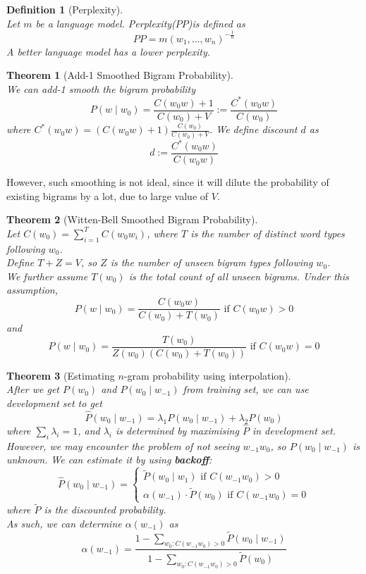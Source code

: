\documentclass[12pt]{article}
\newtheorem{definition}{Definition}[section]
\newtheorem{theorem}{Theorem}[section]
\theoremstyle{definition}
\begin{document}
\begin{definition}[Perplexity]
\hfill\\\normalfont Let $m$ be a language model. Perplexity($PP$)is defined as
\[
PP=m(w_1,\ldots, w_n)^{-\frac{1}{n}}
\]
A better language model has a lower perplexity.
\end{definition}
\begin{theorem}[Add-1 Smoothed Bigram Probability]
\hfill\\\normalfont We can add-1 smooth the bigram probability
\[
P(w\mid w_0) = \frac{C(w_0w)+1}{C(w_0) + V}:=\frac{C^\ast(w_0w)}{C(w_0)}
\]
where $C^\ast(w_0w)=(C(w_0w)+1)\frac{C(w_0)}{C(w_0)+V}$.
We define discount $d$ as
\[
d:=\frac{C^\ast(w_0w)}{C(w_0w)}
\]
\end{theorem}
However, such smoothing is not ideal, since it will dilute the probability of existing bigrams by a lot, due to large value of $V$.
\begin{theorem}[Witten-Bell Smoothed Bigram Probability]
\hfill\\\normalfont Let $C(w_0)=\sum_{i=1}^T C(w_0w_i)$, where $T$ is the number of distinct word types \textit{following} $w_0$.\\
Define  $T+Z=V$, so $Z$ is the number of unseen bigram types following $w_0$.\\
We further assume $T(w_0)$ is the total \textit{count} of all unseen bigrams. Under this assumption,
\[
P(w\mid w_0)=\frac{C(w_0w)}{C(w_0)+ T(w_0)}\text{ if }C(w_0w)>0
\]
and
\[
P(w\mid w_0)=\frac{T(w_0)}{Z(w_0)(C(w_0)+T(w_0))}\text{ if }C(w_0w)=0
\]
\end{theorem}
\begin{theorem}[Estimating {$n$}-gram probability using interpolation]
\hfill\\\normalfont After we get $P(w_0)$ and $P(w_0\mid w_{-1})$ from training set, we can use development set to get
\[
\hat{P}(w_0\mid w_{-1})=\lambda_1 P(w_0\mid w_{-1}) + \lambda_2 P(w_0)
\]
where $\sum_{i}\lambda_i = 1$, and $\lambda_i$ is determined by maximising $\hat{P}$ in development set.\\
However, we may encounter the problem of not seeing $w_{-1}w_0$, so $P(w_0\mid w_{-1})$ is unknown. We can estimate it by using \textbf{backoff}:
\[
\hat{P}(w_0\mid w_{-1})=\begin{cases}
\tilde{P}(w_0\mid w_1)\text{ if }C(w_{-1}w_0)>0\\
\alpha(w_{-1})\cdot \tilde{P}(w_0)\text{ if }C(w_{-1}w_0)=0
\end{cases}
\]
where $\tilde{P}$ is the discounted probability.\\
As such, we can determine $\alpha(w_{-1})$ as
\[
\alpha(w_{-1})=\frac{1-\sum_{w_0: C(w_{-1}w_0)>0}\tilde{P}(w_0\mid w_{-1})}{1-\sum_{w_0: C(w_{-1}w_0)>0}\tilde{P}(w_0)}
\]
\end{theorem}
\end{document}

